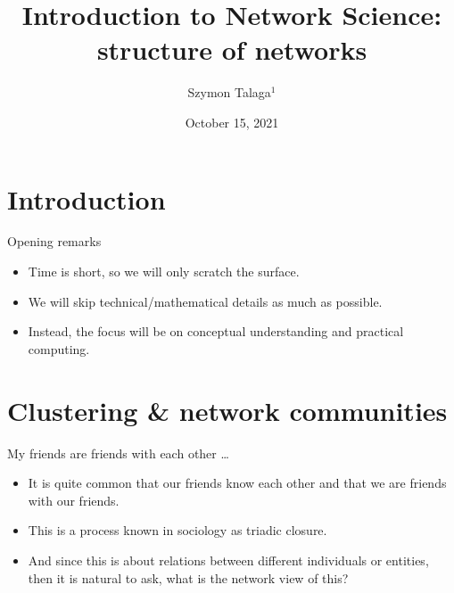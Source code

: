 \documentclass[
    hyperref={colorlinks,linkcolor=blue,urlcolor=blue,citecolor=blue}
]{beamer}
\begin{document}
\title[Structure of networks]{
    Introduction to Network Science:\\structure of networks
}
\author{Szymon Talaga$^1$}
\date{
    October 15, 2021 \\
} %

\frame{\titlepage}

\section{Introduction}

\begin{frame}{Opening remarks}
\begin{itemize}
    \item<2-> Time is short, so we will only scratch the surface.
    \item<3-> We will skip technical/mathematical details as much as possible.
    \item<4-> Instead, the focus will be on conceptual understanding and
    practical computing.
\end{itemize}
\end{frame}

\section{Clustering \& network communities}

\begin{frame}{My friends are friends with each other \ldots}
\begin{itemize}
    \item<1-> It is quite common that our friends know each other and that
    we are friends with our friends.
    \item<2-> This is a process known in sociology as triadic closure.
    \item<3-> And since this is about relations between different individuals
    or entities, then it is natural to ask, what is the network view of this?
\end{itemize}
\end{frame}
\end{document}
